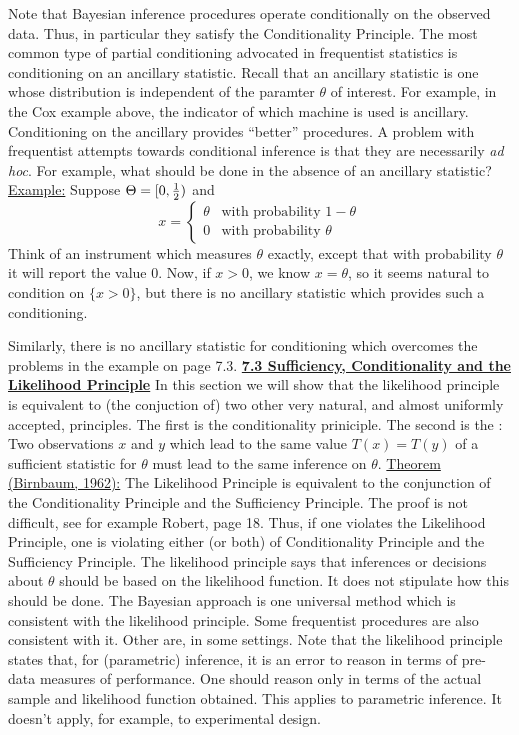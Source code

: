Note that Bayesian inference procedures operate conditionally on the
observed data.  Thus, in particular they satisfy the Conditionality
Principle.
\vskip 4mm
The most common type of partial conditioning advocated in frequentist
statistics is conditioning on an ancillary statistic.  Recall that an
ancillary statistic is one whose distribution is independent of the
paramter $\theta$ of interest.
\vskip 4mm
For example, in the Cox example above, the indicator of which
machine is used is ancillary.  Conditioning on the ancillary provides
``better'' procedures.
\vskip 4mm
A problem with frequentist attempts towards conditional inference is
that they are necessarily {\it ad hoc}.  For example, what should be done in
the absence of an ancillary statistic?
\vskip 4mm
\ni\underline{Example:}  Suppose $\Theta = [0,{1\over 2})$ and
$$x=\left\{ \begin{array}{cc} \theta & \mbox{with probability } 1-\theta \\
0 & \mbox{with probability } \theta \end{array} \right.$$
Think of an instrument which measures $\theta$ exactly, except that with probability
$\theta$ it will report the value 0.  Now, if $x>0$, we know
$x=\theta$, so it seems natural to condition on $\{ x>0\} $, but there
is no ancillary statistic which provides such a conditioning.

Similarly, there is no ancillary statistic for conditioning which
overcomes the problems in the example on page 7.3.
\vskip 8mm
\ni\underline{\bf 7.3 Sufficiency, Conditionality and the Likelihood Principle}
\vskip 4mm
In this section we will show that the likelihood principle is
equivalent to (the conjuction of) two other very natural, and almost
uniformly accepted, principles.  The first is the conditionality
priniciple.  The second is the
\vskip 4mm
: Two
observations $x$ and $y$ which lead to the same value $T(x)=T(y)$ of a
sufficient statistic for $\theta$ must lead to the same inference on
$\theta$.
\vskip 4mm
\ni\underline{Theorem (Birnbaum, 1962):}  The Likelihood Principle is equivalent to the
conjunction of the Conditionality Principle and the Sufficiency
Principle.
\vskip 4mm
The proof is not difficult, see for example Robert, page 18.
\vskip 4mm
Thus, if one violates the Likelihood Principle, one is violating
either (or both) of Conditionality Principle and the Sufficiency
Principle.  The likelihood principle says that inferences or decisions
about $\theta$ should be based on the likelihood function.  It does
not stipulate how this should be done.
\vskip 4mm
The Bayesian approach is one universal method which is consistent with
the likelihood principle.  Some frequentist procedures are also
consistent with it.  Other are, in some settings.  Note that the
likelihood principle states that, for (parametric) inference, it is an error to reason in terms of
pre-data measures of performance.  One should reason only in terms of
the actual sample and likelihood function obtained.  This applies to
parametric inference.  It doesn't apply, for example, to experimental
design.
\vskip 8mm


